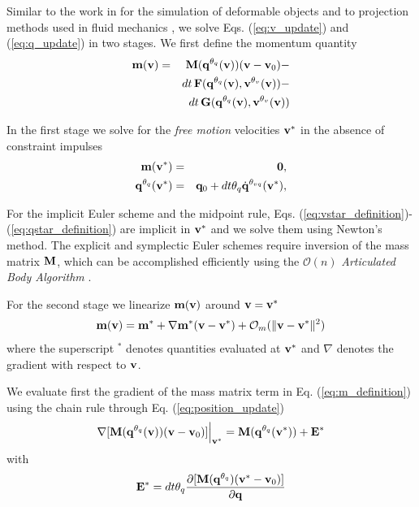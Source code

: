 Similar to the work in \cite{bib:duriez2005realistic} for the simulation of
deformable objects and to projection methods used in fluid mechanics
\cite{bib::bell1991efficient}, we solve Eqs. (\ref{eq:v_update}) and
(\ref{eq:q_update}) in two stages. We first define the momentum quantity
\begin{eqnarray}
	\mf{m}(\mf{v}) &=&
	\mf{M}(\mf{q}^{\theta_{q}}(\mf{v}))(\mf{v}-\mf{v}_0) - \nonumber\\
	&&dt\,\mf{F}(\mf{q}^{\theta_{q}}(\mf{v}), \mf{v}^{\theta_v}(\mf{v}))-\nonumber\\
	&&dt\,\mf{G}(\mf{q}^{\theta_{q}}(\mf{v}), \mf{v}^{\theta_v}(\mf{v}))
	\label{eq:m_definition}
\end{eqnarray}

In the first stage we solve for the
\textit{free motion} velocities ${\mathbf{v}}^*$ in the absence of constraint impulses
\begin{eqnarray}
	\mf{m}(\mf{v}^*) &=& \mf{0},
	\label{eq:vstar_definition}\\
	\mf{q}^{\theta_q}(\mf{v}^*) &=& \mf{q}_0 + dt\theta_q\dot{\mf{q}}^{\theta_{vq}}(\mf{v}^*),
	\label{eq:qstar_definition}
\end{eqnarray}

For the implicit Euler scheme and the midpoint rule, Eqs.
(\ref{eq:vstar_definition})-(\ref{eq:qstar_definition}) are implicit in
${\mathbf{v}}^*$ and we solve them using Newton's method. The explicit and symplectic
Euler schemes require inversion of the mass matrix ${\mathbf{M}}$, which can be
accomplished efficiently using the $\mathcal{O}(n)$
\emph{Articulated Body Algorithm}
\cite{bib:featherstone2008_rigid_body_dynamics_algorithms}.

For the second stage we linearize ${\mathbf{m}}({\mathbf{v}})$ around ${\mathbf{v}} = {\mathbf{v}}^*$ 
\begin{eqnarray}
	{\mathbf{m}}({\mathbf{v}}) = {\mathbf{m}}^* +
	\nabla{\mathbf{m}}^*({\mathbf{v}}-{\mathbf{v}}^*) + \mathcal{O}_m(\Vert{\mathbf{v}}-{\mathbf{v}}^*\Vert^2)
\end{eqnarray}
where the superscript $^*$ denotes quantities evaluated at ${\mathbf{v}}^*$ and
$\nabla$ denotes the gradient with respect to ${\mathbf{v}}$.

We evaluate first the gradient of the mass matrix term in Eq.
(\ref{eq:m_definition}) using the chain rule through Eq.
(\ref{eq:position_update})
\begin{eqnarray}
	\nabla[{\mathbf{M}}({\mathbf{q}}^{\theta_{q}}({\mathbf{v}}))({\mathbf{v}}-{\mathbf{v}}_0)]\Bigr|_{{\mathbf{v}}^*}
	= {\mathbf{M}}({\mathbf{q}}^{\theta_{q}}({\mathbf{v}}^*)) + {\mathbf{E}}^*
\end{eqnarray}
with
\begin{eqnarray}
	\mf{E}^* =
	dt\theta_q\frac{\partial[\mf{M}(\mf{q}^{\theta_{q}})(\mf{v}^*-\mf{v}_0)]}{\partial\mf{q}}
	\label{eq:E_definition}
\end{eqnarray}

